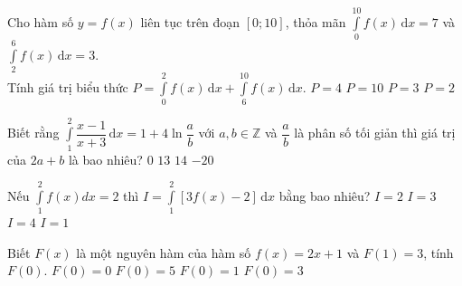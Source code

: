 \begin{ex}%
	Cho hàm số $y=f(x)$ liên tục trên đoạn $[0;10]$, thỏa mãn $\displaystyle\int\limits_0^{10} f(x)\mathrm{\,d}x=7$ và $\displaystyle\int\limits_2^6 f(x)\mathrm{\,d}x=3$.\\
	Tính giá trị biểu thức $P=\displaystyle\int\limits_0^2 f(x)\mathrm{\,d}x+\displaystyle\int\limits_6^{10} f(x)\mathrm{\,d}x$. 
	\choice
	{\True $P=4$}
	{$P=10$}
	{$P=3$}
	{$P=2$}
\end{ex}

\begin{ex}%
	Biết rằng $\displaystyle\int\limits_1^2\dfrac{x-1}{x+3}\mathrm{\,d}x=1+4\ln \dfrac{a}{b}$ với $a,b\in\mathbb{Z}$ và $\dfrac{a}{b}$ là phân số tối giản thì giá trị của $2a+b$ là bao nhiêu?
	\choice
	{$0$}
	{\True $13$}
	{$14$}
	{$-20$}
\end{ex}

\begin{ex}%
	Nếu $\displaystyle\int\limits_1^2 f(x)d x=2$ thì $I=\displaystyle\int\limits_1^2[3f(x)-2]\mathrm{\,d}x$ bằng bao nhiêu?
	\choice
	{$I=2$}
	{$I=3$}
	{\True $I=4$}
	{$I=1$}
\end{ex}

\begin{ex}%
	Biết $F(x)$ là một nguyên hàm của hàm số $f(x)=2x+1$ và $F(1)=3$, tính $F(0)$. 
	\choice
	{$F(0)=0$}
	{$F(0)=5$}
	{\True $F(0)=1$}
	{$F(0)=3$}
\end{ex}

